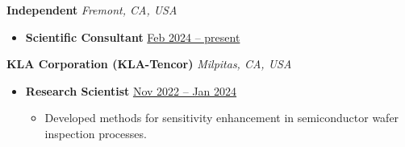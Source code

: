 \documentclass[10.5pt]{article}
\begin{document}
\begin{minipage}[t]{0.85\textwidth}\vspace{0pt}
    \vspace{0.3cm}
\end{minipage}
\begin{minipage}[t]{0.15\textwidth}\vspace{0pt}
\end{minipage}
\vspace{-0.1cm} 
{\color{red}\textbf{Independent} \hfill \textit{Fremont, CA, USA}}\par
\begin{itemize}
    \item
        \textbf{Scientific Consultant}
        \hfill \underline{Feb 2024 -- present} \par
\end{itemize} 

{\color{red}\textbf{KLA Corporation (KLA-Tencor)} \hfill \textit{Milpitas, CA, USA}}\par
\begin{itemize}
    \item
        \textbf{Research Scientist}
        \hfill \underline{Nov 2022 -- Jan 2024} \par
        \begin{itemize}
            \item Developed methods for sensitivity enhancement in semiconductor wafer inspection processes. 
        \end{itemize}
\end{itemize} 
\end{document}

